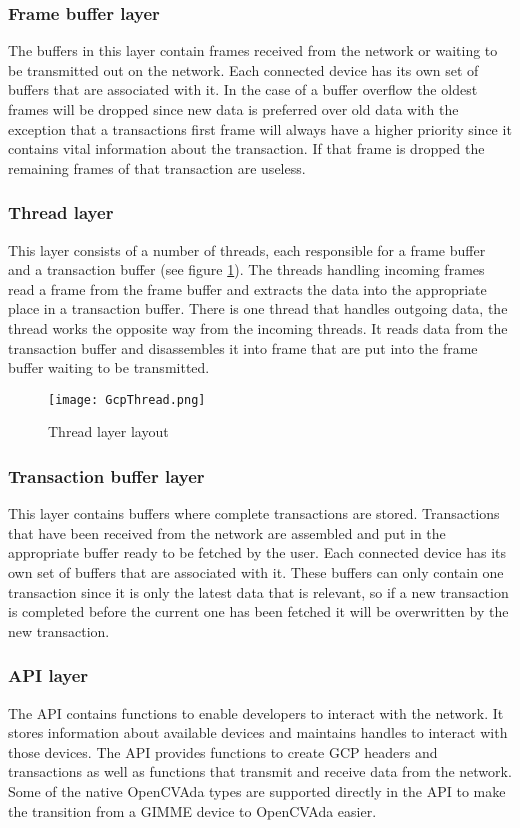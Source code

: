 \subsubsection{Frame buffer layer}
The buffers in this layer contain frames received from the network or waiting to be transmitted out on the network. Each connected device has its own set of buffers that are associated with it. In the case of a buffer overflow the oldest frames will be dropped since new data is preferred over old data with the exception that a transactions first frame will always have a higher priority since it contains vital information about the transaction. If that frame is dropped the remaining frames of that transaction are useless.
\subsubsection{Thread layer}
This layer consists of a number of threads, each responsible for a frame buffer and a transaction buffer (see figure \ref{fig:GcpThread}). The threads handling incoming frames read a frame from the frame buffer and extracts the data into the appropriate place in a transaction buffer. There is one thread that handles outgoing data, the thread works the opposite way from the incoming threads. It reads data from the transaction buffer and disassembles it into frame that are put into the frame buffer waiting to be transmitted.

\begin{figure}
\centering
\texttt{[image: GcpThread.png]}
\caption{Thread layer layout}
\label{fig:GcpThread}
\end{figure}
\subsubsection{Transaction buffer layer}
This layer contains buffers where complete transactions are stored. Transactions that have been received from the network are assembled and put in the appropriate buffer ready to be fetched by the user. Each connected device has its own set of buffers that are associated with it. These buffers can only contain one transaction since it is only the latest data that is relevant, so if a new transaction is completed before the current one has been fetched it will be overwritten by the new transaction.
\subsubsection{API layer}
The API contains functions to enable developers to interact with the network. It stores information about available devices and maintains handles to interact with those devices. The API provides functions to create GCP headers and transactions as well as functions that transmit and receive data from the network. Some of the native OpenCVAda types are supported directly in the API to make the transition from a GIMME device to OpenCVAda easier.